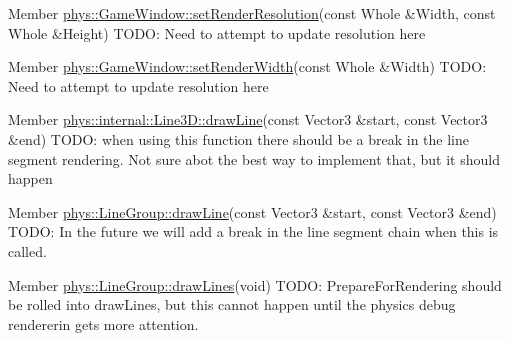 \begin{DoxyDescription}
\item[Member \hyperlink{classphys_1_1GameWindow_a35ecbf1cb77037d33671e0f879f46a30}{phys::GameWindow::setRenderResolution}(const Whole \&Width, const Whole \&Height) ]TODO: Need to attempt to update resolution here 
\end{DoxyDescription}

\label{todo__todo000009}
\hypertarget{todo__todo000009}{}
 
\begin{DoxyDescription}
\item[Member \hyperlink{classphys_1_1GameWindow_a4a6087112f5a958d153fc74bc03897ba}{phys::GameWindow::setRenderWidth}(const Whole \&Width) ]TODO: Need to attempt to update resolution here 
\end{DoxyDescription}

\label{todo__todo000011}
\hypertarget{todo__todo000011}{}
 
\begin{DoxyDescription}
\item[Member \hyperlink{classphys_1_1internal_1_1Line3D_a31bf19dc06547cbe042e1ddfbcf672f3}{phys::internal::Line3D::drawLine}(const Vector3 \&start, const Vector3 \&end) ]TODO: when using this function there should be a break in the line segment rendering. Not sure abot the best way to implement that, but it should happen 
\end{DoxyDescription}

\label{todo__todo000013}
\hypertarget{todo__todo000013}{}
 
\begin{DoxyDescription}
\item[Member \hyperlink{classphys_1_1LineGroup_a141db62ea17d94b9bce421e5df5a8d89}{phys::LineGroup::drawLine}(const Vector3 \&start, const Vector3 \&end) ]TODO: In the future we will add a break in the line segment chain when this is called. 
\end{DoxyDescription}

\label{todo__todo000014}
\hypertarget{todo__todo000014}{}
 
\begin{DoxyDescription}
\item[Member \hyperlink{classphys_1_1LineGroup_ade1bb4f8e1164e1b8d7aeabbc970b79d}{phys::LineGroup::drawLines}(void) ]TODO: PrepareForRendering should be rolled into drawLines, but this cannot happen until the physics debug rendererin gets more attention. 
\end{DoxyDescription}

